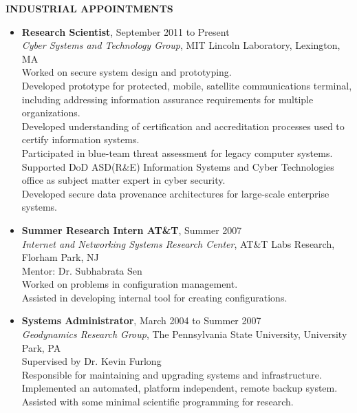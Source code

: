 \documentclass[10pt]{article}
\begin{document}
\vspace{1em} {\Large \textbf{INDUSTRIAL APPOINTMENTS}}
\begin{itemize}
\item \textbf{Research Scientist}, September 2011 to Present\\
  \textit{Cyber Systems and Technology Group}, MIT Lincoln Laboratory, Lexington, MA\\
  Worked on secure system design and prototyping.\\
  Developed prototype for protected, mobile, satellite communications terminal, including addressing information assurance requirements for multiple organizations.\\
  Developed understanding of certification and accreditation processes used to certify information systems.\\
  Participated in blue-team threat assessment for legacy computer systems.\\
  Supported DoD ASD(R\&E) Information Systems and Cyber Technologies office as subject matter expert in cyber security.\\
  Developed secure data provenance architectures for large-scale enterprise systems.\\
  
\item \textbf{Summer Research Intern AT\&T}, Summer 2007\\
  \textit{Internet and Networking Systems Research Center}, AT\&T Labs
  Research,
  Florham Park, NJ\\
  Mentor: Dr. Subhabrata Sen\\
  Worked on problems in configuration management.\\
  Assisted in developing internal tool for creating configurations.

\item \textbf{Systems Administrator}, March 2004 to Summer 2007\\
  \textit{Geodynamics Research Group}, The Pennsylvania State University,
  University Park, PA\\
  Supervised by Dr. Kevin Furlong\\
  Responsible for maintaining and upgrading systems and
  infrastructure.\\
  Implemented an automated, platform independent, remote backup
  system.\\
  Assisted with some minimal scientific programming for research.
\end{itemize}
\end{document}
